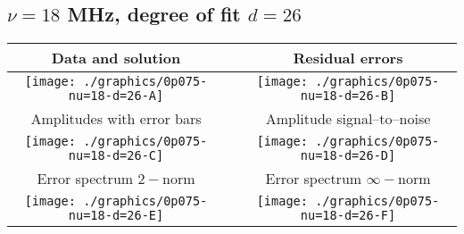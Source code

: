 

% 

\clearpage{}
\break{}

\subsection{$\nu = 18$ MHz, degree of fit $d = 26$}

\begin{table}[h]
    \begin{center}
        \begin{tabular}{ccc}
            Data and solution & \quad & Residual errors \\\hline
            \texttt{[image: ./graphics/0p075-nu=18-d=26-A]} &&
            \texttt{[image: ./graphics/0p075-nu=18-d=26-B]} \\[15pt]
            Amplitudes with error bars && Amplitude signal--to--noise \\\hline
            \texttt{[image: ./graphics/0p075-nu=18-d=26-C]} &&
            \texttt{[image: ./graphics/0p075-nu=18-d=26-D]} \\[15pt]
            Error spectrum $2-$norm && Error spectrum $\infty-$norm \\\hline
            \texttt{[image: ./graphics/0p075-nu=18-d=26-E]} &&
            \texttt{[image: ./graphics/0p075-nu=18-d=26-F]} \\[15pt]
        \end{tabular}
    \end{center}
\label{fig:elev=75, nu=18}
\end{table}



\endinput
